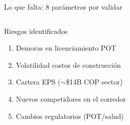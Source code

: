 \documentclass[aspectratio=169, 11pt]{beamer}
\begin{document}
{\begin{frame}{Lo que falta: 8 parámetros por validar}
\begin{columns}[T]
\begin{block}{\small Riesgos identificados}
\footnotesize
\begin{enumerate}\scriptsize
  \item Demoras en licenciamiento POT
  \item Volatilidad costos de construcción
  \item Cartera EPS ($\sim$\$14B COP sector)
  \item Nuevos competidores en el corredor
  \item Cambios regulatorios (POT/salud)
\end{enumerate}
\end{block}
\end{columns}
\end{frame}
}

\end{document}
